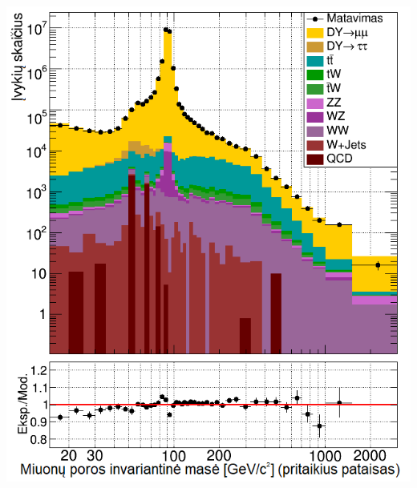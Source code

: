 \documentclass[xcolor=dvipsnames]{beamer}
\begin{document}
\begin{frame}
\begin{minipage}{0.49\textwidth}
		\includegraphics[width=\linewidth]{mumuMassAfter_SMALL.png}
	\end{minipage}
\end{frame}
\end{document}
